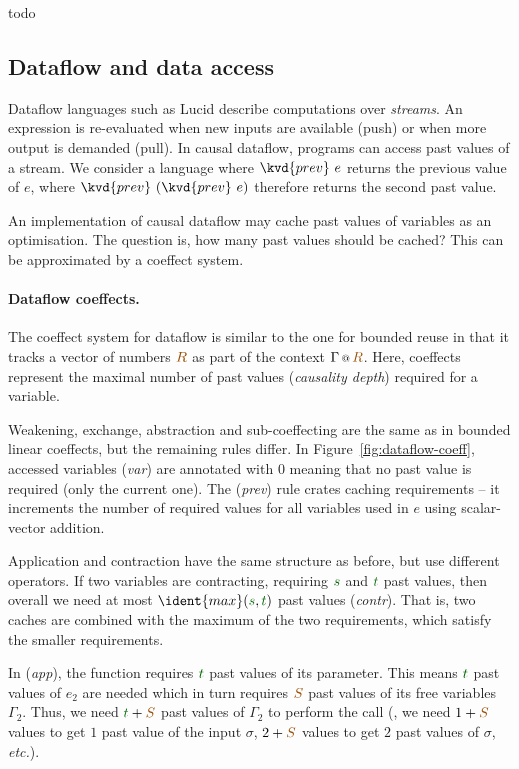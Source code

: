 todo

\subsection{Dataflow and data access}

Dataflow languages such as Lucid \cite{wadge1985lucid} describe computations over \emph{streams}.
An expression is re-evaluated when new inputs are available (push) or when more output
is demanded (pull).  In causal dataflow, programs can access past
values of a stream. We consider a language where $\kvd{prev}~e$
returns the previous value of $e$, where 
$\kvd{prev}~(\kvd{prev}~e)$ therefore returns the second past value.

An implementation of causal dataflow may cache past values of
variables as an optimisation. The question is, how many past values
should be cached?  This can be approximated by a coeffect system.

\paragraph{Dataflow coeffects.} The coeffect system for dataflow is
similar to the one for bounded reuse in that it tracks a vector
of numbers $\aclrd{R}$ as part of the context
$\coctx{\Gamma}{\aclrd{R}}$. Here, coeffects represent the maximal number of
past values (\emph{causality depth}) required for a variable. 

Weakening, exchange, abstraction and sub-coeffecting are the same as in bounded linear
coeffects, but the remaining rules differ. In Figure~\ref{fig:dataflow-coeff},
accessed variables (\emph{var}) are annotated with
$0$ meaning that no past value is required (only the
current one). The (\emph{prev}) rule crates caching requirements --
it increments the number of required values for all variables
used in $e$ using scalar-vector addition.

Application and contraction have the same structure as before, 
but use different operators. If two variables 
are contracting, requiring $\cclrd{s}$ and $\cclrd{t}$ past
values, then overall we need at most
$\ident{max}(\cclrd{s}, \cclrd{t})$ past values (\emph{contr}). That is, 
two caches are combined with the maximum of the two requirements, 
which satisfy the smaller requirements. 

In (\emph{app}), the function requires $\cclrd{t}$ past values of
its parameter.  This means $\cclrd{t}$ past values of
$e_2$ are needed which in turn requires $\aclrd{S}$ past values of its free
variables $\Gamma_2$. Thus, we need $\cclrd{t}+\aclrd{S}$ past values of $\Gamma_2$ to perform the
call (\eg{}, we need $1+\aclrd{S}$ values to
get $1$ past value of the input $\sigma$, $2+\aclrd{S}$
values to get $2$ past values of $\sigma$, \emph{etc.}).


